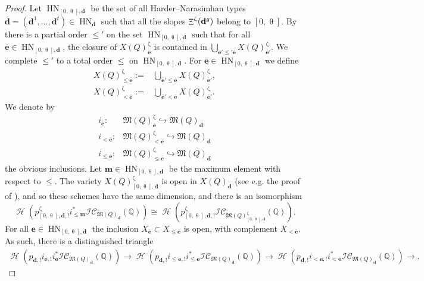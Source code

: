 \documentclass[a4paper,10pt]{amsart}
\newcommand{\dd}{\mathbf{d}}
\newcommand{\ee}{\mathbf{e}}
\newcommand{\mm}{\mathbf{m}}
\DeclareMathOperator{\HN}{HN}
\newcommand{\Mst}{\mathfrak{M}}
\newcommand{\ICS}{\mathcal{IC}}
\renewcommand{\theta}{\uptheta}
\renewcommand{\zeta}{\upzeta}
\DeclareMathOperator{\Mu}{\Upxi}
\DeclareMathOperator{\Ho}{\mathcal{H}}
\begin{document}
\begin{proof}
Let $\HN_{[0,\theta],\dd}$ be the set of all Harder--Narasimhan types $\overline{\dd}=(\dd^1,\ldots,\dd^t)\in\HN_{\dd}$ such that all the slopes $\Mu^{\zeta}(\dd^g)$ belong to $[0,\theta]$.  By \cite[Prop.3.7]{Reineke_HN} there is a partial order $\leq'$ on the set $\HN_{[0,\theta],\dd}$ such that for all $\overline{\ee}\in\HN_{[0,\theta],\dd}$, the closure of $X(Q)^{\zeta}_{\overline{\ee}}$ is contained in $\bigcup_{\overline{\ee}'\leq' \overline{\ee}}X(Q)^{\zeta}_{\overline{\ee}'}$.  We complete $\leq'$ to a total order $\leq$ on $\HN_{[0,\theta],\dd}$.  For $\overline{\ee}\in\HN_{[0,\theta],\dd}$ we define
\begin{align*}
X(Q)^{\zeta}_{\leq \overline{\ee}}:=&\bigcup_{\overline{\ee}'\leq \overline{\mathbf{e}}}X(Q)^{\zeta}_{\overline{\ee}'},\\
X(Q)^{\zeta}_{<\overline{\ee}}:=&\bigcup_{\overline{\ee}'< \overline{\mathbf{e}}}X(Q)^{\zeta}_{\overline{\ee}'}.
\end{align*}
We denote by 
\begin{align*}
i_{\overline{\ee}}\colon&\Mst(Q)_{\overline{\ee}}^{\zeta}\hookrightarrow\Mst(Q)_{\dd} \\
i_{<\overline{\ee}}\colon&\Mst(Q)_{<\overline{\ee}}^{\zeta}\hookrightarrow\Mst(Q)_{\dd}\\
i_{\leq\overline{\ee}}\colon &\Mst(Q)_{\leq \overline{\ee}}^{\zeta}\hookrightarrow\Mst(Q)_{\dd}
\end{align*}
the obvious inclusions.  Let $\mm\in\HN_{[0,\theta],\dd}$ be the maximum element with respect to $\leq$.  The variety $X(Q)_{[0,\theta],\dd}^{\zeta}$ is open in $X(Q)_{\dd}$ (see e.g. the proof of \cite[Prop.4.20]{DMSS13}), and so these schemes have the same dimension, and there is an isomorphism
\[
\Ho\left(p^\zeta_{[0,\theta],\dd,!}i_{\leq\mm}^*\ICS_{\Mst(Q)_{\dd}}(\mathbb{Q})\right)\cong \Ho\left(p^\zeta_{[0,\theta],\dd,!}\ICS_{\Mst(Q)_{[0,\theta],\dd}^{\zeta}}(\mathbb{Q})\right).
\]
For all $\ee\in\HN_{[0,\theta],\dd}$ the inclusion $X_{\overline{\mathbf{e}}}\subset X_{\leq \overline{\mathbf{e}}}$ is open, with complement $X_{<\overline{\mathbf{e}}}$.  As such, there is a distinguished triangle
\begin{align}
\label{trian}
\Ho\left( p_{\dd,!}i_{\overline{\ee},!}i_{\overline{\ee}}^*\ICS_{\Mst(Q)_{\dd}}(\mathbb{Q})\right)\rightarrow \Ho\left( p_{\dd,!}i_{\leq \overline{\ee},!}i_{\leq \overline{\ee}}^*\ICS_{\Mst(Q)_{\dd}}(\mathbb{Q})\right)\rightarrow \Ho\left( p_{\dd,!}i_{<\overline{\ee},!}i_{<\overline{\ee}}^*\ICS_{\Mst(Q)_{\dd}}(\mathbb{Q})\right)\rightarrow.

\end{align}
\end{proof}
\end{document}
